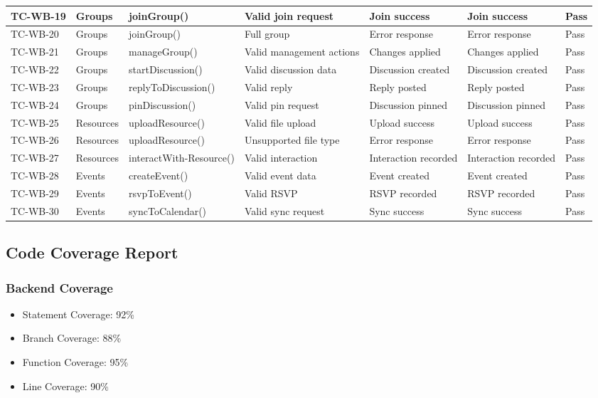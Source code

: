{\begin{longtable}{|C{1.5cm}|C{2.2cm}|C{3cm}|C{2cm}|C{2cm}|C{2cm}|C{1cm}|}
\hline
TC-WB-19 & Groups & joinGroup() & Valid join request & Join success & Join success & Pass \\
\hline
TC-WB-20 & Groups & joinGroup() & Full group & Error response & Error response & Pass \\
\hline
TC-WB-21 & Groups & manageGroup() & Valid management actions & Changes applied & Changes applied & Pass \\
\hline
TC-WB-22 & Groups & startDiscussion() & Valid discussion data & Discussion created & Discussion created & Pass \\
\hline
TC-WB-23 & Groups & replyToDiscussion() & Valid reply & Reply posted & Reply posted & Pass \\
\hline
TC-WB-24 & Groups & pinDiscussion() & Valid pin request & Discussion pinned & Discussion pinned & Pass \\
\hline
TC-WB-25 & Resources & uploadResource() & Valid file upload & Upload success & Upload success & Pass \\
\hline
TC-WB-26 & Resources & uploadResource() & Unsupported file type & Error response & Error response & Pass \\
\hline
TC-WB-27 & Resources & interactWith-Resource() & Valid interaction & Interaction recorded & Interaction recorded & Pass \\
\hline
TC-WB-28 & Events & createEvent() & Valid event data & Event created & Event created & Pass \\
\hline
TC-WB-29 & Events & rsvpToEvent() & Valid RSVP & RSVP recorded & RSVP recorded & Pass \\
\hline
TC-WB-30 & Events & syncToCalendar() & Valid sync request & Sync success & Sync success & Pass \\
\hline
\end{longtable}
}

\subsection{Code Coverage Report}

\subsubsection{Backend Coverage}
\begin{itemize}
    \item Statement Coverage: 92\%
    \item Branch Coverage: 88\%
    \item Function Coverage: 95\%
    \item Line Coverage: 90\%
\end{itemize}

